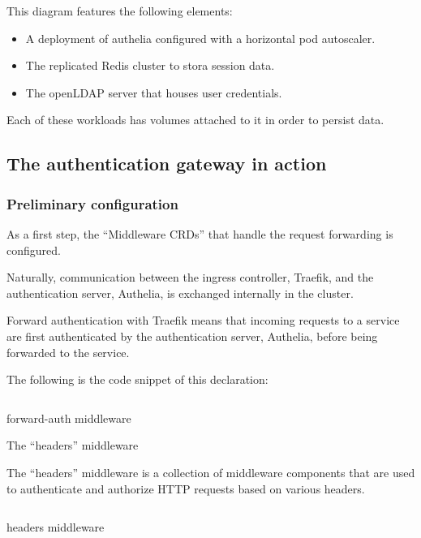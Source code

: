 This diagram features the following elements: 

\begin{itemize}[label={--}]
\item A deployment of authelia configured with a horizontal pod autoscaler.  
\item The replicated Redis cluster to stora session data. 
\item The openLDAP server that houses user credentials. 
\end{itemize}

Each of these workloads has volumes attached to it in order to persist data. 

\subsection{The authentication gateway in action }

\subsubsection{Preliminary configuration }

As a first step, the “Middleware CRDs” that handle the request forwarding is configured. 

Naturally, communication between the ingress controller, Traefik, and the authentication server, Authelia, is exchanged internally in the cluster. 


Forward authentication with Traefik means that incoming requests to a service are first authenticated by the authentication server, Authelia, before being forwarded to the service. 

The following is the code snippet of this declaration: 

\begin{listing}[H]
    \inputminted{Yaml}{codeListing/middleware_forward_auth.yml}
    \caption{forward-auth middleware}
    \label{lst:forward-auth middleware}
\end{listing}

The “headers” middleware 

The “headers” middleware is a collection of middleware components that are used to authenticate and authorize HTTP requests based on various headers.  

\begin{listing}[H]
    \inputminted{Yaml}{codeListing/middleware_headers.yml}
    \caption{headers middleware}
    \label{lst:headers middleware}
\end{listing} 

